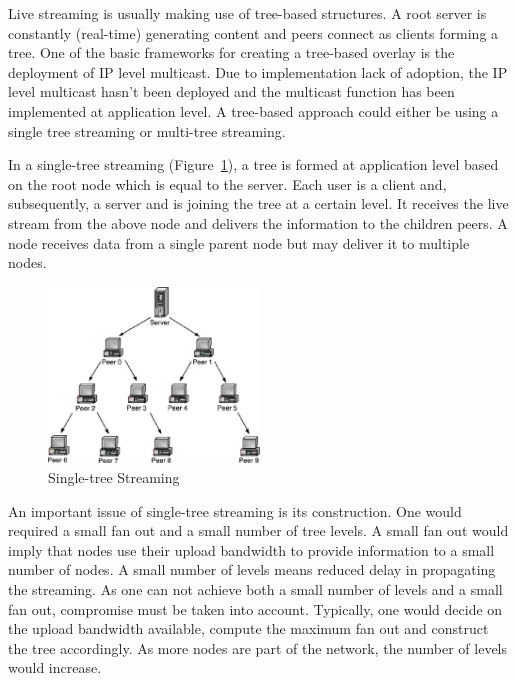 Live streaming is usually making use of tree-based structures. A root server
is constantly (real-time) generating content and peers connect as clients
forming a tree. One of the basic frameworks for creating a tree-based overlay
is the deployment of IP level multicast. Due to implementation lack of
adoption, the IP level multicast hasn't been deployed and the multicast
function has been implemented at application level. A tree-based approach
could either be using a single tree streaming or multi-tree streaming.

In a single-tree streaming
(Figure~\ref{fig:p2p-systems:single-tree-streaming}), a tree is formed at
application level based on the root node which is equal to the server. Each
user is a client and, subsequently, a server and is joining the tree at a
certain level. It receives the live stream from the above node and delivers
the information to the children peers. A node receives data from a single
parent node but may deliver it to multiple nodes.

\begin{figure}
  \centering
  \includegraphics[width=0.5\textwidth]{src/img/p2p-systems/single-tree-streaming}
  \caption{Single-tree Streaming}
  \label{fig:p2p-systems:single-tree-streaming}
\end{figure}

An important issue of single-tree streaming is its construction. One would
required a small fan out and a small number of tree levels. A small fan out
would imply that nodes use their upload bandwidth to provide information to a
small number of nodes. A small number of levels means reduced delay in
propagating the streaming. As one can not achieve both a small number of
levels and a small fan out, compromise must be taken into account. Typically,
one would decide on the upload bandwidth available, compute the maximum fan
out and construct the tree accordingly. As more nodes are part of the network,
the number of levels would increase.

